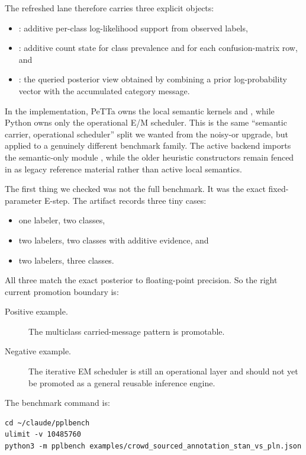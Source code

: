 \documentclass[11pt,openany]{report}
\begin{document}
The refreshed lane therefore carries three explicit objects:
\begin{itemize}
\item {}: additive per-class log-likelihood support
from observed labels,
\item {}: additive count state for class prevalence and
for each confusion-matrix row, and
\item {}: the queried posterior view obtained by
combining a prior log-probability vector with the accumulated category
message.
\end{itemize}
In the implementation, PeTTa owns the local semantic kernels
 and , while Python
owns only the operational E/M scheduler.  This is the same
``semantic carrier, operational scheduler'' split we wanted from the noisy-or
upgrade, but applied to a genuinely different benchmark family.  The active
backend imports the semantic-only module
,
while the older heuristic constructors remain fenced in
 as legacy
reference material rather than active local semantics.

The first thing we checked was not the full benchmark.  It was the exact
fixed-parameter E-step.  The artifact
 records
three tiny cases:
\begin{itemize}
\item one labeler, two classes,
\item two labelers, two classes with additive evidence, and
\item two labelers, three classes.
\end{itemize}
All three match the exact posterior to floating-point precision.  So the
right current promotion boundary is:
\begin{description}
\item[Positive example.] The multiclass carried-message pattern is promotable.
\item[Negative example.] The iterative EM scheduler is still an operational
layer and should not yet be promoted as a general reusable inference engine.
\end{description}

The benchmark command is:
\begin{lstlisting}
cd ~/claude/pplbench
ulimit -v 10485760
python3 -m pplbench examples/crowd_sourced_annotation_stan_vs_pln.json
\end{lstlisting}
\end{document}
